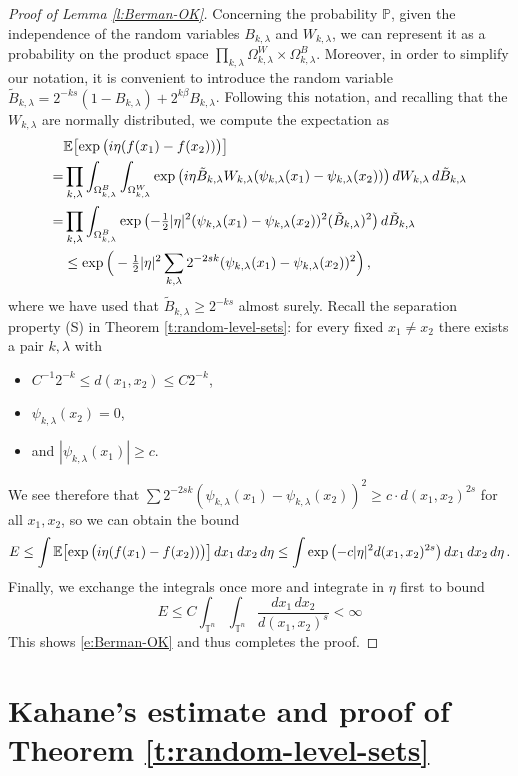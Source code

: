 \documentclass[11pt,reqno]{amsart}
\newcommand{\T}{{\mathbb T}}
\newcommand{\E}{{\mathbb E}}
\renewcommand{\exp}{{\rm exp}\,}
\theoremstyle{definition}
\numberwithin{equation}{section}
\begin{document}
\begin{proof}[Proof of Lemma \ref{l:Berman-OK}]
Concerning the probability $\mathbb P$, given the independence of the random variables $B_{k, \lambda}$ and $W_{k,\lambda}$, we can represent it as a probability on the product space $\prod_{k,\lambda}\Omega^W_{k,\lambda}\times \Omega^B_{k,\lambda}$. Moreover, in order to simplify our notation, it is convenient to introduce the random variable $\tilde{B}_{k,\lambda} = 2^{-ks} (1- B_{k,\lambda}) + 2^{k\beta} B_{k, \lambda}$. Following this notation, and recalling that the $W_{k,\lambda}$ are normally distributed, we compute the expectation as
\begin{align*}
 &\E\bigr[\exp \bigl(i\eta(f(x_1)-f(x_2))\bigl)\bigr]\\
= &\prod_{k,\lambda} \int_{\Omega^B_{k,\lambda}} \int_{\Omega^W_{k,\lambda}}\exp \bigl(i\eta \tilde{B}_{k,\lambda}W_{k,\lambda}(\psi_{k,\lambda}(x_1)-\psi_{k,\lambda}(x_2))\bigr)\,dW_{k,\lambda}\,d\tilde{B}_{k, \lambda}\\
= &\prod_{k,\lambda} \int_{\Omega^B_{k,\lambda}} \exp \bigl(-\tfrac{1}{2}|\eta|^2 (\psi_{k,\lambda}(x_1)-\psi_{k,\lambda}(x_2))^2(\tilde{B}_{k,\lambda})^2\bigr)\,d\tilde{B}_{k,\lambda}\\
&\le  \exp \Big(-\tfrac{1}{2}|\eta|^2\sum_{k,\lambda}2^{-2sk}(\psi_{k,\lambda}(x_1)-\psi_{k,\lambda}(x_2))^2\Big)\, ,
\end{align*}
where we have used that $\tilde{B}_{k,\lambda} \geq 2^{-ks}$ almost surely.
Recall the separation property (S) in Theorem \ref{t:random-level-sets}: for every fixed $x_1\neq x_2$ there exists a pair $k,\lambda$ with
\begin{itemize}
\item $C^{-1} 2^{-k}\leq  d(x_1,x_2) \leq C 2^{-k}$,
\item $\psi_{k,\lambda}(x_2)=0$,
\item and $|\psi_{k,\lambda}(x_1)|\ge c$.
\end{itemize}
We see therefore that $\sum 2^{-2sk}(\psi_{k,\lambda}(x_1)-\psi_{k,\lambda}(x_2))^2\ge c\cdot d(x_1,x_2)^{2s}$ for all $x_1,x_2$, so we can obtain the bound
\[
E \leq \int \E\bigl[\exp \bigl(i\eta(f(x_1)-f(x_2))\bigr)\bigr]\, dx_1\, dx_2\, d\eta
\le \int \exp \bigl(-c|\eta|^2d(x_1,x_2)^{2s}\bigr)\, dx_1\, dx_2\, d\eta\, .
\]
Finally, we exchange the integrals once more and integrate in $\eta$ first to bound 
\[
E \leq C\int_{\T^n}\int_{\T^n}\frac{dx_1\,dx_2}{d(x_1,x_2)^s}<\infty
\]
This shows \eqref{e:Berman-OK} and thus completes the proof.
\end{proof}

\section{Kahane's estimate and proof of Theorem \ref{t:random-level-sets}}
\end{document}
